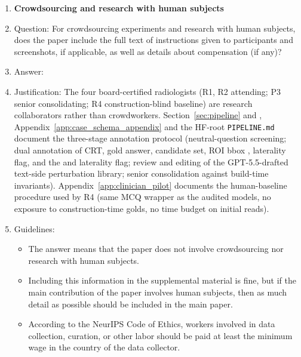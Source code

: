 \documentclass{article}
\providecommand{\DIFaddtex}[1]{{\protect\color{blue} \sf #1}} %
\providecommand{\DIFdeltex}[1]{{\protect\color{red} \scriptsize #1}} %
\providecommand{\DIFaddbegin}{} %
\providecommand{\DIFaddend}{} %
\providecommand{\DIFdelbegin}{} %
\providecommand{\DIFdelend}{} %
\providecommand{\DIFadd}[1]{\texorpdfstring{\DIFaddtex{#1}}{#1}} %
\providecommand{\DIFdel}[1]{\texorpdfstring{\DIFdeltex{#1}}{}} %
\begin{document}
\begin{enumerate}
\item {\bf Crowdsourcing and research with human subjects}
    \item[] Question: For crowdsourcing experiments and research with human subjects, does the paper include the full text of instructions given to participants and screenshots, if applicable, as well as details about compensation (if any)?
    \item[] Answer: \answerYes{}
    \item[] Justification: The four board-certified radiologists (\textsc{R1}, \textsc{R2} attending; \textsc{P3} senior consolidating; \textsc{R4} construction-blind baseline) are research collaborators rather than crowdworkers. Section~\ref{sec:pipeline}\DIFdelbegin \DIFdel{and }\DIFdelend \DIFaddbegin \DIFadd{, }\DIFaddend Appendix~\ref{app:case_schema_appendix} \DIFaddbegin \DIFadd{and the HF-root \texttt{PIPELINE.md} }\DIFaddend document the three-stage annotation protocol (neutral-question screening; dual annotation of CRT, gold answer, candidate set, ROI bbox \DIFdelbegin \DIFdel{, laterality flag, and the }\DIFdelend \DIFaddbegin \DIFadd{and laterality flag; review and editing of the GPT-5.5-drafted }\DIFaddend text-side perturbation library; senior consolidation against build-time invariants). Appendix~\ref{app:clinician_pilot} documents the human-baseline procedure used by \textsc{R4} (same MCQ wrapper as the audited models, no exposure to construction-time golds, no time budget on initial reads).
    \item[] Guidelines:
    \begin{itemize}
        \item The answer \answerNA{} means that the paper does not involve crowdsourcing nor research with human subjects.
        \item Including this information in the supplemental material is fine, but if the main contribution of the paper involves human subjects, then as much detail as possible should be included in the main paper.
        \item According to the NeurIPS Code of Ethics, workers involved in data collection, curation, or other labor should be paid at least the minimum wage in the country of the data collector.
    \end{itemize}


\end{enumerate}
\end{document}
